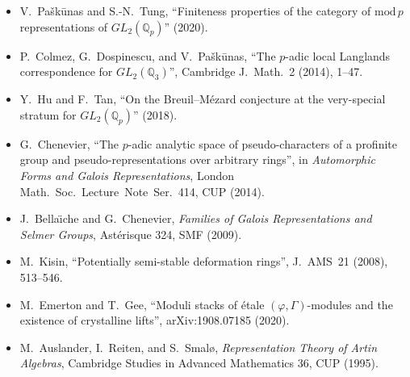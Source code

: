 \begin{itemize}
\item V.~Pa{\v s}k{\=u}nas and S.-N.~Tung, ``Finiteness properties of
the category of \(\mathrm{mod}\,p\) representations of
\(GL_{2}(\mathbb{Q}_{p})\)'' (2020).
\item P.~Colmez, G.~Dospinescu, and V.~Pa{\v s}k{\=u}nas, ``The
\(p\)-adic local Langlands correspondence for \(GL_{2}(\mathbb{Q}_{3})\)'',
Cambridge J.~Math.~2 (2014), 1--47.
\item Y.~Hu and F.~Tan, ``On the Breuil--M{\'e}zard conjecture at the
very-special stratum for \(GL_{2}(\mathbb{Q}_{p})\)'' (2018).
\item G.~Chenevier, ``The \(p\)-adic analytic space of pseudo-characters
of a profinite group and pseudo-representations over arbitrary rings'',
in \emph{Automorphic Forms and Galois Representations}, London
Math.~Soc.~Lecture~Note~Ser.\ 414, CUP (2014).
\item J.~Bella{\"\i}che and G.~Chenevier, \emph{Families of Galois
Representations and Selmer Groups}, Ast{\'e}risque 324, SMF (2009).
\item M.~Kisin, ``Potentially semi-stable deformation rings'',
J.~AMS~21 (2008), 513--546.
\item M.~Emerton and T.~Gee, ``Moduli stacks of {\'e}tale
\((\varphi,\Gamma)\)-modules and the existence of crystalline lifts'',
arXiv:1908.07185 (2020).
\item M.~Auslander, I.~Reiten, and S.~Smal{\o}, \emph{Representation
Theory of Artin Algebras}, Cambridge Studies in Advanced Mathematics
36, CUP (1995).
\end{itemize}
